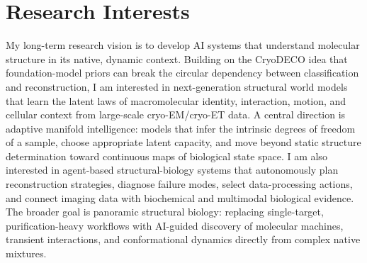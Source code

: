 \documentclass[10pt,letterpaper]{article}
\begin{document}
\section*{Research Interests}
My long-term research vision is to develop AI systems that understand molecular structure in its native, dynamic context. Building on the CryoDECO idea that foundation-model priors can break the circular dependency between classification and reconstruction, I am interested in next-generation structural world models that learn the latent laws of macromolecular identity, interaction, motion, and cellular context from large-scale cryo-EM/cryo-ET data. A central direction is adaptive manifold intelligence: models that infer the intrinsic degrees of freedom of a sample, choose appropriate latent capacity, and move beyond static structure determination toward continuous maps of biological state space. I am also interested in agent-based structural-biology systems that autonomously plan reconstruction strategies, diagnose failure modes, select data-processing actions, and connect imaging data with biochemical and multimodal biological evidence. The broader goal is panoramic structural biology: replacing single-target, purification-heavy workflows with AI-guided discovery of molecular machines, transient interactions, and conformational dynamics directly from complex native mixtures.
\end{document}
